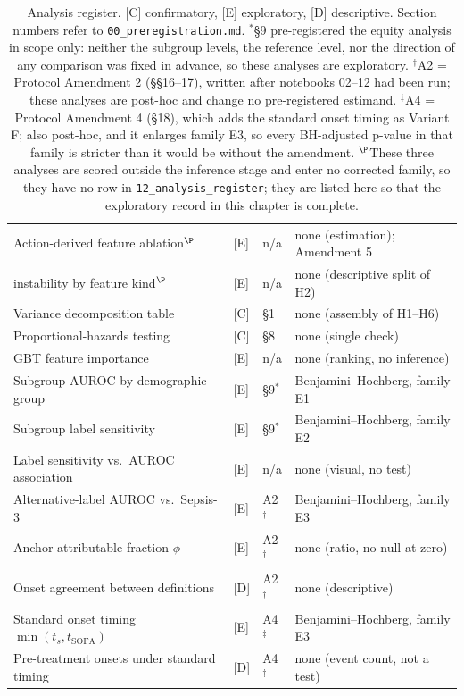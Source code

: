 \begin{table}[H]
\begin{tabular}{p{5.0cm}lp{1.9cm}p{4.2cm}}
        Action-derived feature ablation$^\P$      & [E] & n/a     & none (estimation); Amendment 5         \\
        \quad instability by feature kind$^\P$     & [E] & n/a     & none (descriptive split of H2)         \\
        Variance decomposition table              & [C] & \S1     & none (assembly of H1--H6)              \\
        Proportional-hazards testing              & [C] & \S8     & none (single check)                    \\
        GBT feature importance                    & [E] & n/a     & none (ranking, no inference)           \\
        Subgroup AUROC by demographic group       & [E] & \S9$^*$ & Benjamini--Hochberg, family E1         \\
        Subgroup label sensitivity                & [E] & \S9$^*$ & Benjamini--Hochberg, family E2         \\
        Label sensitivity vs.\ AUROC association  & [E] & n/a     & none (visual, no test)                 \\
        Alternative-label AUROC vs.\ Sepsis-3     & [E] & A2$^\dagger$ & Benjamini--Hochberg, family E3    \\
        Anchor-attributable fraction $\phi$       & [E] & A2$^\dagger$ & none (ratio, no null at zero)     \\
        Onset agreement between definitions       & [D] & A2$^\dagger$ & none (descriptive)                \\
        Standard onset timing $\min(t_s, t_{\text{SOFA}})$ & [E] & A4$^\ddagger$ & Benjamini--Hochberg, family E3 \\
        Pre-treatment onsets under standard timing & [D] & A4$^\ddagger$ & none (event count, not a test)   \\
        \bottomrule
    \end{tabular}
    \caption{Analysis register. [C] confirmatory, [E] exploratory,
    [D] descriptive. Section numbers refer to
    \texttt{00\_preregistration.md}. $^*$\S9 pre-registered the equity analysis
    in scope only: neither the subgroup levels, the reference level, nor the
    direction of any comparison was fixed in advance, so these analyses are
    exploratory. $^\dagger$A2 = Protocol Amendment 2 (\S\S16--17), written after
    notebooks 02--12 had been run; these analyses are post-hoc and change no
    pre-registered estimand. $^\ddagger$A4 = Protocol Amendment 4 (\S18), which
    adds the standard onset timing as Variant F; also post-hoc, and it enlarges
    family E3, so every BH-adjusted p-value in that family is stricter than it
    would be without the amendment. $^\P$These three analyses are scored
    outside the inference stage and enter no corrected family, so they have no
    row in \texttt{12\_analysis\_register}; they are listed here so that the
    exploratory record in this chapter is complete.}
    \label{tab:register}
\end{table}
